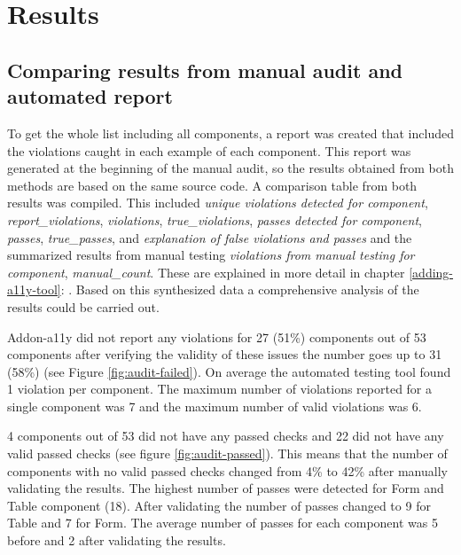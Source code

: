 \documentclass{master_thesis}
\begin{document}
\section{Results}


\subsection{Comparing results from manual audit and automated report}

To get the whole list including all components, a report was created that included the violations caught in each example of each component. This report was generated at the beginning of the manual audit, so the results obtained from both methods are based on the same source code. A comparison table from both results was compiled. This included \textit{unique violations detected for component}, \textit{report\_violations}, \textit{violations}, \textit{true\_violations}, \textit{passes detected for component}, \textit{passes}, \textit{true\_passes}, and \textit{explanation of false violations and passes} and the summarized results from manual testing \textit{violations from manual testing for component}, \textit{manual\_count}. These are explained in more detail in chapter \ref{adding-a11y-tool}: . Based on this synthesized data a comprehensive analysis of the results could be carried out.

Addon-a11y did not report any violations for 27 (51\%) components out of 53 components after verifying the validity of these issues the number goes up to 31 (58\%) (see Figure \ref{fig:audit-failed}). On average the automated testing tool found 1 violation per component. The maximum number of violations reported for a single component was 7 and the maximum number of valid violations was 6.

4 components out of 53 did not have any passed checks and 22 did not have any valid passed checks (see figure \ref{fig:audit-passed}). This means that the number of components with no valid passed checks changed from 4\%  to 42\% after manually validating the results. The highest number of passes were detected for Form and Table component (18). After validating the number of passes changed to 9 for Table and 7 for Form. The average number of passes for each component was 5 before and 2 after validating the results.
\end{document}
